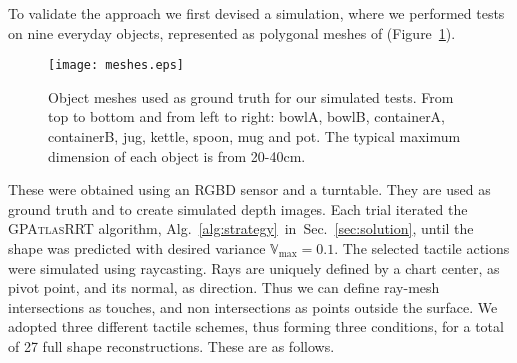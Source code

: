 
To validate the approach we first devised a simulation, where we performed tests on nine everyday objects, represented as polygonal meshes of (Figure~\ref{fig:meshes}).
\begin{figure}[t]
    \centering
    \texttt{[image: meshes.eps]}
    \caption{Object meshes used as ground truth for our simulated tests. From top to bottom and from left to right: bowlA, bowlB, containerA, containerB, jug, kettle, spoon, mug and pot. The typical maximum dimension of each object is from 20-40cm.}
    \label{fig:meshes}
\end{figure}
These were obtained using an RGBD sensor and a turntable. They are used as ground truth and to create simulated depth images. Each trial iterated the \textsc{GPAtlasRRT} algorithm, Alg.~\ref{alg:strategy}~in~Sec.~\ref{sec:solution},
until the shape was predicted with desired variance $\mathbb{V}_{\max} = 0.1$.
The selected tactile actions were simulated using  raycasting. Rays are uniquely defined by a chart center, as pivot point, and its normal, as direction.
Thus we can define ray-mesh intersections as touches, and non intersections as points outside the surface. We adopted three different tactile schemes, thus forming three conditions, for a total of 27 full shape reconstructions. These are as follows.

